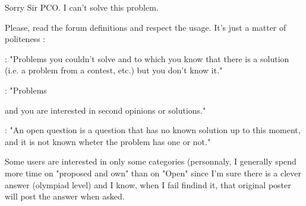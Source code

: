 


\begin{solution}
	\begin{tcolorbox}
Sorry Sir PCO. I can't solve this problem.\end{tcolorbox}
Please, read the forum definitions and respect the usage. It's just a matter of politeness :

 : "Problems you couldn't solve and to which you know that there is a solution (i.e. a problem from a contest, etc.) but you don't know it."

 : "Problems  and you are interested in second opinions or solutions."

 : "An open question is a question that has no known solution up to this moment, and it is not known wheter the problem has one or not."

Some users are interested in only some categories (personnaly, I generally spend more time on "proposed and own" than on "Open" since I'm sure there is a clever answer (olympiad level) and I know, when I fail findind it, that original poster will post the answer when asked.
\end{solution}



